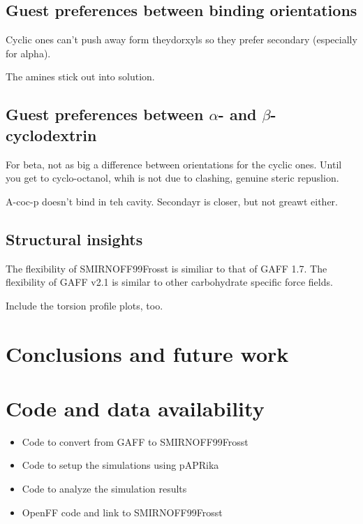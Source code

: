 \documentclass[9pt,lineno]{elife}
\begin{document}
\subsection{Guest preferences between binding orientations}


Cyclic ones can’t push away form theydorxyls so they prefer secondary (especially for alpha).

The amines stick out into solution.


\subsection{Guest preferences between $\alpha$- and $\beta$-cyclodextrin}

For beta, not as big a difference between orientations for the cyclic ones. Until you get to cyclo-octanol, whih is not due to clashing, genuine steric repuslion.

A-coc-p doesn’t bind in teh cavity. Secondayr is closer, but not greawt either.



\subsection{Structural insights}

The flexibility of SMIRNOFF99Frosst is similiar to that of GAFF 1.7.
The flexibility of GAFF v2.1 is similar to other carbohydrate specific force fields.

Include the torsion profile plots, too.

\section{Conclusions and future work}


\section{Code and data availability}
\begin{itemize}
	\item Code to convert from GAFF to SMIRNOFF99Frosst
	\item Code to setup the simulations using pAPRika
	\item Code to analyze the simulation results
	\item OpenFF code and link to SMIRNOFF99Frosst
\end{itemize}
\end{document}
